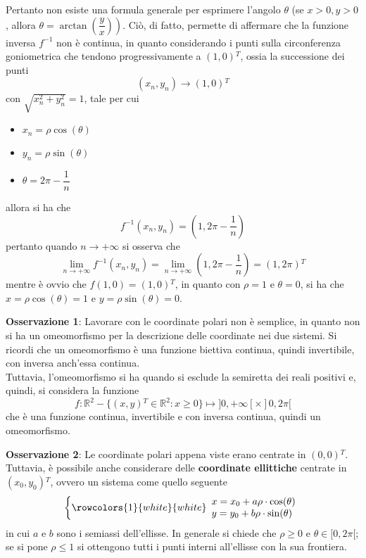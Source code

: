 \documentclass[a4paper]{extarticle}
\begin{document}
Pertanto non esiste una formula generale per esprimere l'angolo $\theta$ (se $x>0,y>0$, allora $\theta=\arctan \left.\left(\dfrac{y}{x}\right)\right)$. Ciò, di fatto, permette di affermare che la funzione inversa $f^{-1}$ non è continua, in quanto considerando i punti sulla circonferenza goniometrica che tendono progressivamente a $(1,0){^T}$, ossia la successione dei punti
\[(x_n,y_n) \to (1,0){^T}\]
con $\sqrt{x_n^2+y_n^2}=1$, tale per cui
\begin{itemize}
    \item $x_n=\rho \cos(\theta)$
    \item $y_n=\rho \sin(\theta)$
    \item $\theta=2\pi-\dfrac{1}{n}$
\end{itemize}
allora si ha che
\[f^{-1}(x_n,y_n)=\left(1,2\pi-\dfrac{1}{n}\right)\]
pertanto quando $n \to +\infty$ si osserva che
\[\lim_{n \to +\infty} f^{-1}(x_n,y_n)=\lim_{n \to+\infty}\left(1,2\pi-\dfrac{1}{n}\right)=(1,2\pi){^T}\]
mentre è ovvio che $f(1,0)=(1,0){^T}$, in quanto con $\rho=1$ e $\theta=0$, si ha che $x=\rho \cos(\theta)=1$ e $y=\rho \sin(\theta)=0$.

\vspace{1em}
\noindent
\textbf{Osservazione 1}: Lavorare con le coordinate polari non è semplice, in quanto non si ha un omeomorfismo per la descrizione delle coordinate nei due sistemi. Si ricordi che un omeomorfismo è una funzione biettiva continua, quindi invertibile, con inversa anch'essa continua.\\
Tuttavia, l'omeomorfismo si ha quando si esclude la semiretta dei reali positivi e, quindi, si considera la funzione
\[f : \mathbb{R}^2 - \{(x,y){^T} \in \mathbb{R}^2 : x \geq 0\} \longmapsto ]0,+\infty[ \times ]0,2\pi[\]
che è una funzione continua, invertibile e con inversa continua, quindi un omeomorfismo.

\vspace{1em}
\noindent
\textbf{Osservazione 2}: Le coordinate polari appena viste erano centrate in $(0,0){^T}$. Tuttavia, è possibile anche considerare delle \textbf{coordinate ellittiche} centrate in $(x_0,y_0){^T}$, ovvero un sistema come quello seguente
\[
\left\{
    \rowcolors{1}{white}{white}
    \begin{array}{l}
        x=x_0 + a \rho \cdot \cos(\theta)\\
        y=y_0 + b \rho \cdot \sin(\theta)\\
    \end{array}  
    \right.
\]
in cui $a$ e $b$ sono i semiassi dell'ellisse. In generale si chiede che $\rho \geq 0$ e $\theta \in [0,2\pi[$; se si pone $\rho \leq 1$ si ottengono tutti i punti interni all'ellisse con la sua frontiera.
\end{document}
